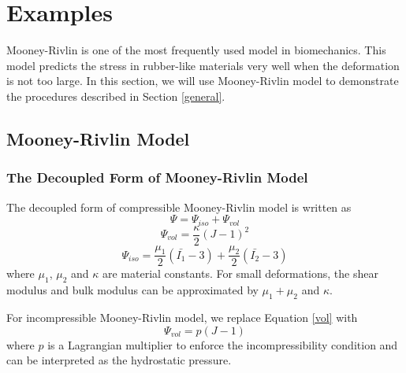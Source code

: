 \section{Examples}
Mooney-Rivlin is one of the most frequently used model in biomechanics. This model predicts the stress in rubber-like materials very well when the deformation is not too large. In this section, we will use Mooney-Rivlin model to demonstrate the procedures described in Section \ref{general}. 

%
\subsection{Mooney-Rivlin Model}
\subsubsection{The Decoupled Form of Mooney-Rivlin Model}
The decoupled form of compressible Mooney-Rivlin model is written as
\begin{equation}
\Psi = \Psi_{iso} + \Psi_{vol}
\end{equation}
\begin{equation} \label{vol}
\Psi_{vol} = \frac{\kappa}{2}(J - 1)^2
\end{equation}
\begin{equation} \label{iso}
\Psi_{iso} = \frac{\mu_1}{2}(\bar{I_1} - 3) + \frac{\mu_2}{2}(\bar{I_2} - 3)
\end{equation}
where $\mu_1$, $\mu_2$ and $\kappa$ are material constants. For small deformations, the shear modulus and bulk modulus can be approximated by $\mu_1+\mu_2$ and $\kappa$.

For incompressible Mooney-Rivlin model, we replace Equation \ref{vol} with
\begin{equation}
\Psi_{vol} = p(J - 1)
\end{equation}
where $p$ is a Lagrangian multiplier to enforce the incompressibility condition and can be interpreted as the hydrostatic pressure.  

%
